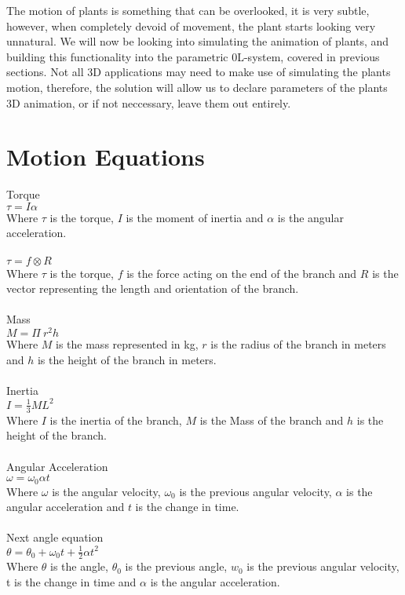 

\lettrine[lines=3]{T}{}he motion of plants is something that can be overlooked, it is very subtle, however, when completely devoid of movement, the plant starts looking very unnatural. We will now be looking into simulating the animation of plants, and building this functionality into the parametric 0L-system, covered in previous sections. Not all 3D applications may need to make use of simulating the plants motion, therefore, the solution will allow us to declare parameters of the plants 3D animation, or if not neccessary, leave them out entirely. \\

\cite{barron2001real}

\section{Motion Equations}

Torque\\
$ \tau = I\alpha $ \\
Where $\tau$ is the torque, $I$ is the moment of inertia and $\alpha$ is the angular acceleration.\\
\\
$ \tau = f \otimes R $ \\
Where $\tau$ is the torque, $f$ is the force acting on the end of the branch and $R$ is the vector representing the length and orientation of the branch. \\
\\
Mass \\
$ M = \Pi~ r ^ 2 h $  \\
Where $M$ is the mass represented in kg, $r$ is the radius of the branch in meters and $h$ is the height of the branch in meters. \\
\\
Inertia\\
$ I = \frac{1}{3} M L ^ 2 $ \\ 
Where $I$ is the inertia of the branch, $M$ is the Mass of the branch and $h$ is the height of the branch. \\
\\
Angular Acceleration\\
$ \omega = \omega _0 \alpha t $ \\
Where $\omega$ is the angular velocity, $\omega _0 $ is the previous angular velocity, $\alpha$ is the angular acceleration and $t$ is the change in time. \\
\\
Next angle equation\\
$ \theta = \theta _0 + \omega _0 t + \frac{1}{2} \alpha t ^2 $ \\
Where $\theta$ is the angle, $\theta _0$ is the previous angle, $w _0$ is the previous angular velocity, t is the change in time and $\alpha$ is the angular acceleration. \\
\\

